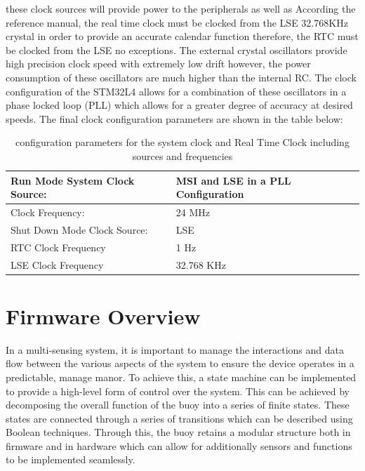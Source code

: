 these clock sources will provide power to the peripherals as well as  According the reference manual, the real time clock must be clocked from the LSE 32.768KHz crystal in order to provide an accurate calendar function therefore, the RTC must be clocked from the LSE no exceptions. The external crystal oscillators provide high precision clock speed with extremely low drift however, the power consumption of these oscillators are much higher than the internal RC. The clock configuration of the STM32L4 allows for a combination of these oscillators in a phase locked loop (PLL) which allows for a greater degree of accuracy at desired speeds. The final clock configuration parameters are shown in the table below:

\begin{table}[H]
    \centering
    \caption{configuration parameters for the system clock and Real Time Clock including sources and frequencies}
    \begin{tabular}{|l|l|}
    \hline
    Run Mode System Clock Source: & MSI and LSE in a PLL Configuration \\
    \hline
     Clock Frequency: & 24 MHz \\
     \hline
     Shut Down Mode Clock Source: & LSE \\
     \hline 
     RTC Clock Frequency & 1 Hz \\
     \hline 
     LSE Clock Frequency  & 32.768 KHz \\
     \hline 
    \end{tabular}
    \label{tab:clock_conf}
\end{table}

\section{Firmware Overview}

In a multi-sensing system, it is important to manage the interactions and data flow between the various aspects of the system to ensure the device operates in a predictable, manage manor. To achieve this, a state machine can be implemented to provide a high-level form of control over the system. This can be achieved by decomposing the overall function of the buoy into a series of finite states. These states are connected through a series of transitions which can be described using Boolean techniques. Through this, the buoy retains a modular structure both in firmware and in hardware which can allow for additionally sensors and functions to be implemented seamlessly.\par 


